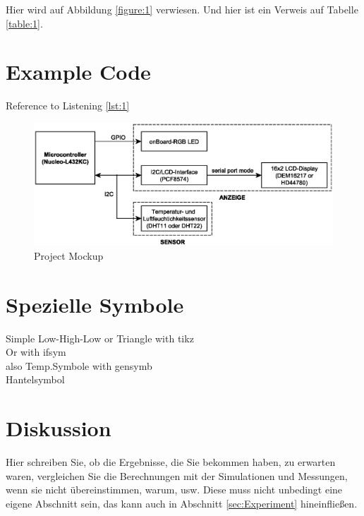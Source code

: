 \documentclass[12pt,a4paper]{article}
\begin{document}
	
	Hier wird auf Abbildung \ref{figure:1} verwiesen. Und hier ist ein Verweis auf Tabelle \ref{table:1}.
	

  		
\section{Example Code}
	
	 	
	Reference to Listening \ref{lst:1}

\begin{figure}[H]
	\centering
	\includegraphics[width=0.8\linewidth]{Project_Mockup}
	\caption{Project Mockup}
	\label{figure:2}
\end{figure}

\pagebreak

\section{Spezielle Symbole}
Simple Low-High-Low  or Triangle  with tikz \\
Or with ifsym \FallingEdge \\
also Temp.Symbole with gensymb \celsius \space \ohm \\
Hantelsymbol \laplace

\section{Diskussion}
Hier schreiben Sie, ob die Ergebnisse, die Sie bekommen haben, zu erwarten waren, vergleichen Sie die Berechnungen mit der 
Simulationen und Messungen, wenn sie nicht übereinstimmen, warum, usw. Diese muss nicht unbedingt eine eigene Abschnitt sein, 
das kann auch in Abschnitt \ref{sec:Experiment} hineinfließen.
\end{document}
